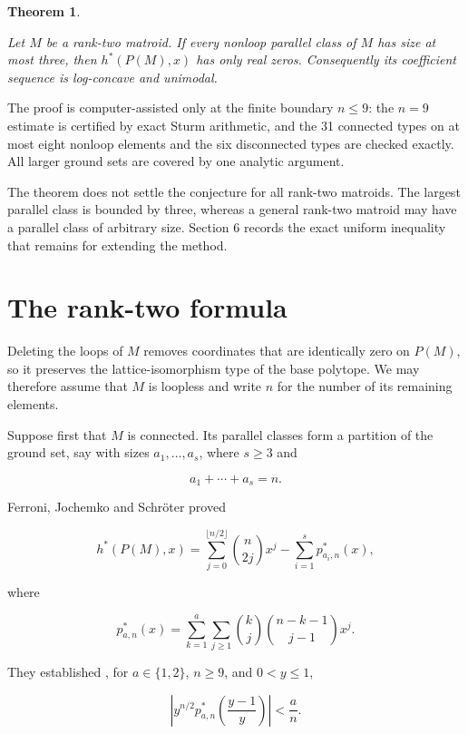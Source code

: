 \documentclass[11pt]{article}
\newtheorem{theorem}{Theorem}
\begin{document}
\Needspace{0.16\textheight}
\begin{theorem}
\label{thm:main}

Let $M$ be a rank-two matroid. If every nonloop parallel class of $M$ has
size at most three, then $h^*(P(M),x)$ has only real zeros. Consequently its
coefficient sequence is log-concave and unimodal.
\end{theorem}

The proof is computer-assisted only at the finite boundary $n\le 9$: the
$n=9$ estimate is certified by exact Sturm arithmetic, and the 31 connected
types on at most eight nonloop elements and the six disconnected types are
checked exactly. All larger ground sets are covered by one analytic argument.

The theorem does not settle the conjecture for all rank-two matroids. The
largest parallel class is bounded by three, whereas a general rank-two matroid
may have a parallel class of arbitrary size. Section 6 records the exact
uniform inequality that remains for extending the method.

\section{The rank-two formula}


Deleting the loops of $M$ removes coordinates that are identically zero on
$P(M)$, so it preserves the lattice-isomorphism type of the base polytope.
We may therefore assume that $M$ is loopless and write $n$ for the number
of its remaining elements.

Suppose first that $M$ is connected. Its parallel classes form a partition
of the ground set, say with sizes $a_1,\ldots,a_s$, where $s\ge 3$ and

\[
a_1+\cdots+a_s=n.
\]

Ferroni, Jochemko and Schröter \cite[Proposition~5.1]{fjs} proved

\[
h^*(P(M),x)
=\sum_{j=0}^{\lfloor n/2\rfloor}\binom{n}{2j}x^j
-\sum_{i=1}^s p^*_{a_i,n}(x),                                      \tag{2.1}
\]

where

\[
p^*_{a,n}(x)
=\sum_{k=1}^{a}\sum_{j\ge1}
  \binom{k}{j}\binom{n-k-1}{j-1}x^j.                               \tag{2.2}
\]

They established \cite[Lemma~5.3]{fjs}, for $a\in\{1,2\}$, $n\ge9$, and
$0<y\le1$,

\[
\left|y^{n/2}p^*_{a,n}\!\left(\frac{y-1}{y}\right)\right|<\frac an.
                                                                        \tag{2.3}
\]
\end{document}
